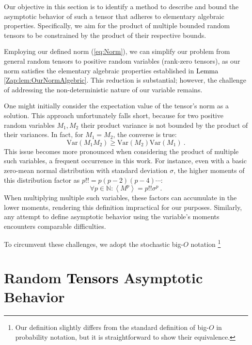 \documentclass{article} %
\begin{document}
Our objective in this section is to identify a method to describe and bound the asymptotic behavior of such a tensor that adheres to elementary algebraic properties. Specifically, we aim for the product of multiple bounded random tensors to be constrained by the product of their respective bounds.

Employing our defined norm (\ref{eq:Norm}), we can simplify our problem from general random tensors to positive random variables (rank-zero tensors), as our norm satisfies the elementary algebraic properties established in \textcolor{black}{Lemma} \ref{Zap:lem:OurNormAlgebric}. This reduction is substantial; however, the challenge of addressing the non-deterministic nature of our variable remains.

One might initially consider the expectation value of the tensor's norm as a solution. This approach unfortunately falls short, because for two positive random variables $M_1,M_2$ their product variance is not bounded by the product of their variances. In fact, for $M_1=M_2$, the converse is true:
\begin{equation}
\text{Var}\left(M_{1}M_{2}\right)\geq\text{Var}\left(M_{2}\right)\text{Var}\left(M_{1}\right) \ .
\end{equation}
This issue becomes more pronounced when considering the product of multiple such variables, a frequent occurrence in this work. For instance, even with a basic zero-mean normal distribution with standard deviation \(\sigma\), the higher moments of this distribution factor as \(p!!=p(p-2)(p-4)\cdots\):
\begin{equation}
\forall p\in\mathbb{N}:\left\langle M^{p}\right\rangle =p!!\sigma^{p} \ .
\end{equation}
When multiplying multiple such variables, these factors can accumulate in the lower moments, rendering this definition impractical for our purposes. Similarly, any attempt to define asymptotic behavior using the variable's moments encounters comparable difficulties.

To circumvent these challenges, we adopt the stochastic big-\(O\) notation \cite{OxforDicStat2003,DiscreteMulti2007}\footnote{Our definition slightly differs from the standard definition of big-$O$ in probability notation, but it is straightforward to show their equivalence.}

\section{Random \textcolor{black}{Tensors} Asymptotic Behavior}
\end{document}
